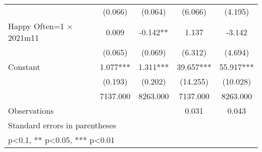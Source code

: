 \begin{table}[htbp]
\begin{tabular}{l*{4}{c}}
                &  (0.066)   &  (0.064)   &  (6.066)   &  (4.195)   \\
Happy Often=1 $\times$ 2021m11&    0.009   &   -0.142** &    1.137   &   -3.142   \\
                &  (0.065)   &  (0.069)   &  (6.312)   &  (4.694)   \\
Constant        &    1.077***&    1.311***&   39.657***&   55.917***\\
                &  (0.193)   &  (0.202)   & (14.255)   & (10.028)   \\
\midrule
\hspace{2mm}    & 7137.000   & 8263.000   & 7137.000   & 8263.000   \\
Observations    &            &            &    0.031   &    0.043   \\
\bottomrule
\multicolumn{5}{l}{\footnotesize Standard errors in parentheses}\\
\multicolumn{5}{l}{\footnotesize * p<0.1, ** p<0.05, *** p<0.01}\\
\end{tabular}
\end{table}
